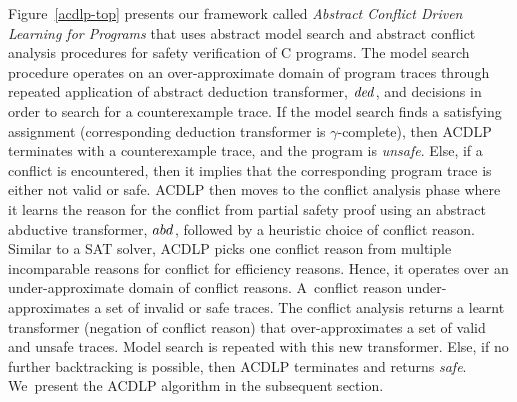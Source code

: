 Figure~\ref{acdlp-top} presents our framework called \emph{Abstract Conflict
Driven Learning for Programs} that uses abstract model search and abstract
conflict analysis procedures for safety verification of C programs.  The
model search procedure operates on an over-approximate domain of program
traces through repeated application of abstract deduction transformer,
$\mathit{ded}^{}$, and decisions in order to search for a counterexample
trace.  If the model search finds a satisfying assignment (corresponding
deduction transformer is $\gamma$-complete), then ACDLP terminates with a
counterexample trace, and the program is \emph{unsafe}.  Else, if a conflict
is encountered, then it implies that the corresponding program trace is
either not valid or safe.  ACDLP then moves to the conflict analysis phase
where it learns the reason for the conflict from partial safety proof using
an abstract abductive transformer, $abd_{}^{}$, followed by a heuristic
choice of conflict reason.  Similar to a SAT solver, ACDLP picks one
conflict reason from multiple incomparable reasons for conflict for
efficiency reasons.  Hence, it operates over an under-approximate domain of
conflict reasons.  A~conflict reason under-approximates a set of invalid or
safe traces.  The conflict analysis returns a learnt transformer (negation
of conflict reason) that over-approximates a set of valid and unsafe traces. 
Model search is repeated with this new transformer.  Else, if no further
backtracking is possible, then ACDLP terminates and returns \emph{safe}. 
We~present the ACDLP algorithm in the subsequent section.

